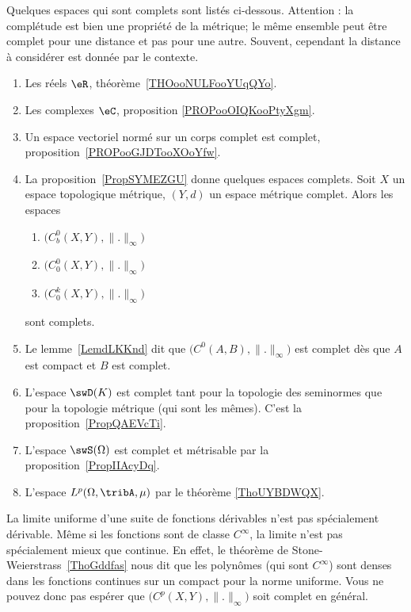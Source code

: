 Quelques espaces qui sont complets sont listés ci-dessous. Attention : la complétude est bien une propriété de la métrique; le même ensemble peut être complet pour une distance et pas pour une autre. Souvent, cependant la distance à considérer est donnée par  le contexte.
\begin{multicols}{2}
	\begin{enumerate}
		\item
		      Les réels \( \eR\), théorème~\ref{THOooNULFooYUqQYo}.
          \item
              Les complexes \( \eC\), proposition \ref{PROPooOIQKooPtyXgm}.
		\item
		      Un espace vectoriel normé sur un corps complet est complet, proposition~\ref{PROPooGJDTooXOoYfw}.
		\item
		      La proposition~\ref{PropSYMEZGU} donne quelques espaces complets. Soit \( X\) un espace topologique métrique, \( (Y,d)\) un espace métrique complet. Alors les espaces
		      \begin{enumerate}
			      \item
			            \( \big( C^0_b(X,Y),\| . \|_{\infty} \big)\)
			      \item
			            \( \big( C^0_0(X,Y),\| . \|_{\infty} \big)\)
			      \item
			            \( \big( C^k_0(X,Y),\| . \|_{\infty} \big)\)
		      \end{enumerate}
		      sont complets.
		\item
		      Le lemme~\ref{LemdLKKnd} dit que \( \big( C^0(A,B),\| . \|_{\infty}\big)\) est complet dès que \( A\) est compact et \( B\) est complet.

		\item
		      L'espace \( \swD(K)\) est complet tant pour la topologie des seminormes que pour la topologie métrique (qui sont les mêmes). C'est la proposition~\ref{PropQAEVcTi}.
		\item
		      L'espace \( \swS(\Omega)\) est complet et métrisable par la proposition~\ref{PropIIAcyDq}.
		\item
		      L'espace \( L^p(\Omega,\tribA,\mu)\) par le théorème \ref{ThoUYBDWQX}.
	\end{enumerate}
\end{multicols}

La limite uniforme d'une suite de fonctions dérivables n'est pas spécialement dérivable. Même si les fonctions sont de classe \(  C^{\infty}\), la limite n'est pas spécialement mieux que continue. En effet, le théorème de Stone-Weierstrass~\ref{ThoGddfas} nous dit que les polynômes (qui sont \(  C^{\infty}\)) sont denses dans les fonctions continues sur un compact pour la norme uniforme. Vous ne pouvez donc pas espérer que \( \big( C^p(X,Y),\| . \|_{\infty} \big)\) soit complet en général.

